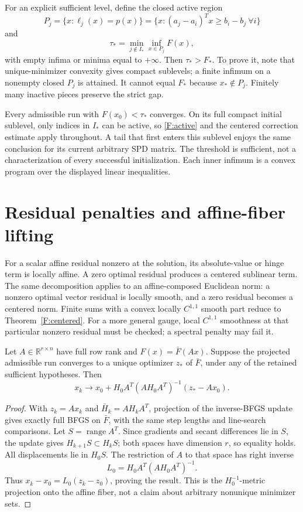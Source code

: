 For an explicit sufficient level, define the closed active region
\[
 P_j=\{x:\ell_j(x)=p(x)\}
 =\{x:(a_j-a_i)^Tx\ge b_i-b_j\ \forall i\}
\]
and
\begin{equation}\label{F:basin}
 \tau_* =\min_{j\notin I_*}\inf_{x\in P_j}F(x),
\end{equation}
with empty infima or minima equal to $+\infty$. Then $\tau_*>F_*$. To prove it, note that unique-minimizer convexity gives compact sublevels; a finite infimum on a nonempty closed $P_j$ is attained. It cannot equal $F_*$ because $x_*\notin P_j$. Finitely many inactive pieces preserve the strict gap.

Every admissible run with $F(x_0)<\tau_*$ converges. On its full compact initial sublevel, only indices in $I_*$ can be active, so \eqref{F:active} and the centered correction estimate apply throughout. A tail that first enters this sublevel enjoys the same conclusion for its current arbitrary SPD matrix. The threshold is sufficient, not a characterization of every successful initialization. Each inner infimum is a convex program over the displayed linear inequalities.

\section{Residual penalties and affine-fiber lifting}
For a scalar affine residual nonzero at the solution, its absolute-value or hinge term is locally affine. A zero optimal residual produces a centered sublinear term. The same decomposition applies to an affine-composed Euclidean norm: a nonzero optimal vector residual is locally smooth, and a zero residual becomes a centered norm. Finite sums with a convex locally $C^{1,1}$ smooth part reduce to Theorem~\ref{F:centered}. For a more general gauge, local $C^{1,1}$ smoothness at that particular nonzero residual must be checked; a spectral penalty may fail it.

\begin{theorem}\label{F:lifting}
Let $A\in\mathbb R^{r\times n}$ have full row rank and $F(x)=\bar F(Ax)$. Suppose the projected admissible run converges to a unique optimizer $z_*$ of $\bar F$, under any of the retained sufficient hypotheses. Then
\[
 x_k\to x_0+H_0A^T(AH_0A^T)^{-1}(z_*-Ax_0).
\]
\end{theorem}
\begin{proof}
With $z_k=Ax_k$ and $\bar H_k=AH_kA^T$, projection of the inverse-BFGS update gives exactly full BFGS on $\bar F$, with the same step lengths and line-search comparisons. Let $S=\operatorname{range}A^T$. Since gradients and secant differences lie in $S$, the update gives $H_{k+1}S\subset H_kS$; both spaces have dimension $r$, so equality holds. All displacements lie in $H_0S$. The restriction of $A$ to that space has right inverse
\[
 L_0=H_0A^T(AH_0A^T)^{-1}.
\]
Thus $x_k-x_0=L_0(z_k-z_0)$, proving the result. This is the $H_0^{-1}$-metric projection onto the affine fiber, not a claim about arbitrary nonunique minimizer sets.
\end{proof}

